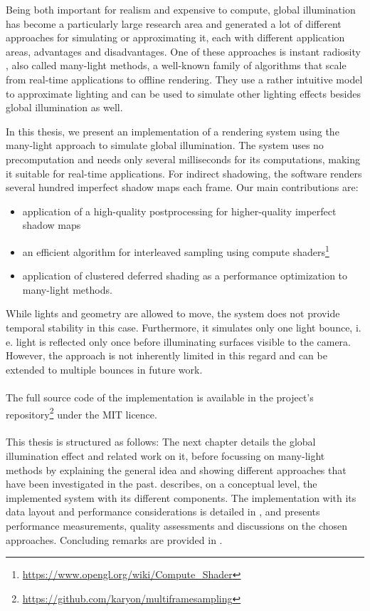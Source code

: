 Being both important for realism and expensive to compute, global illumination has become a particularly large research area and generated a lot of different approaches for simulating or approximating it, each with different application areas, advantages and disadvantages. One of these approaches is instant radiosity \citep{Keller:1997:InstantRadiosity}, also called many-light methods, a well-known family of algorithms that scale from real-time applications to offline rendering. They use a rather intuitive model to approximate lighting and can be used to simulate other lighting effects besides global illumination as well.

In this thesis, we present an implementation of a rendering system using the many-light approach to simulate global illumination. The system uses no precomputation and needs only several milliseconds for its computations, making it suitable for real-time applications. For indirect shadowing, the software renders several hundred imperfect shadow maps \citep{ritschel2008ism} each frame. Our main contributions are:
\begin{itemize}
    \item application of a high-quality postprocessing for higher-quality imperfect shadow maps
    \item an efficient algorithm for interleaved sampling \citep{Keller:2001:InterleavedSampling} using compute shaders\footnote{\url{https://www.opengl.org/wiki/Compute_Shader}}
    \item application of clustered deferred shading \citep{olsson2012clustered} as a performance optimization to many-light methods.
\end{itemize}

While lights and geometry are allowed to move, the system does not provide temporal stability in this case. Furthermore, it simulates only one light bounce, i.\,e. light is reflected only once before illuminating surfaces visible to the camera. However, the approach is not inherently limited in this regard and can be extended to multiple bounces in future work.
\\
\\
The full source code of the implementation is available in the project's repository\footnote{\url{https://github.com/karyon/multiframesampling}} under the MIT licence.
\\
\\
This thesis is structured as follows: The next chapter details the global illumination effect and related work on it, before focussing on many-light methods by explaining the general idea and showing different approaches that have been investigated in the past.  describes, on a conceptual level, the implemented system with its different components. The implementation with its data layout and performance considerations is detailed in , and  presents performance measurements, quality assessments and discussions on the chosen approaches. Concluding remarks are provided in .


\cleardoublepage
